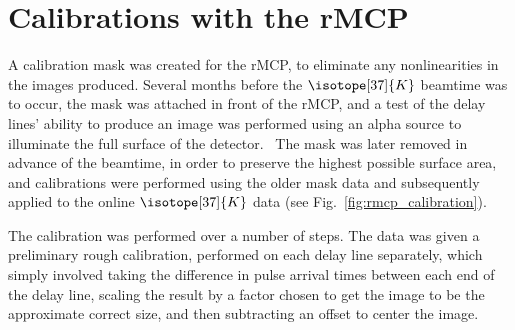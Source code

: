 
\section{Calibrations with the rMCP}
\label{sec:rmcp_cals}
A calibration mask was created for the rMCP, to eliminate any nonlinearities in the images produced.  Several months before the $\isotope[37]{K}$ beamtime was to occur, the mask was attached in front of the rMCP, and a test of the delay lines' ability to produce an image was performed using an alpha source to illuminate the full surface of the detector.~  The mask was later removed in advance of the beamtime, in order to preserve the highest possible surface area, and calibrations were performed using the older mask data and subsequently applied to the online $\isotope[37]{K}$ data (see Fig.~\ref{fig:rmcp_calibration}).

The calibration was performed over a number of steps.  The data was given a preliminary rough calibration, performed on each delay line separately, which simply involved taking the difference in pulse arrival times between each end of the delay line, scaling the result by a factor chosen to get the image to be the approximate correct size, and then subtracting an offset to center the image.  

